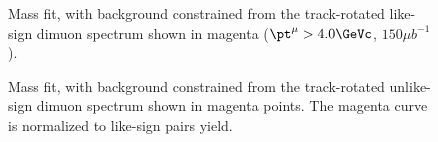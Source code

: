 \begin{figure}[hbtp]
  \begin{center}
    \caption{Mass fit, with background constrained from the track-rotated like-sign dimuon spectrum shown in magenta ($\pt^\mu>4.0\GeVc$, $150 \mu b^{-1}$).}
    \label{fig:track_rotation}
  \end{center}
\end{figure}

\begin{figure}[hbtp]
  \begin{center}
    \caption{Mass fit, with background constrained from the track-rotated unlike-sign dimuon spectrum shown in magenta points. The magenta curve is normalized to like-sign pairs yield.}
    \label{fig:track_rotation_OS}
  \end{center}
\end{figure}

